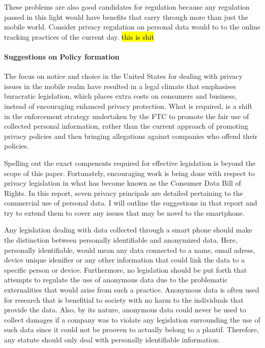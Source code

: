 
These problems are also good candidates for regulation because any regulation passed in this light would have benefits that carry through more than just the mobile world. Consider privacy regulation on personal data would to to the online tracking practices of the current day. \hl{this is shit}

	\paragraph{Suggestions on Policy formation}


The focus on notice and choice in the United States for dealing with privacy issues in the mobile realm have resulted in a legal climate that emphasises buracratic legislation, which places extra costs on consumers and business, instead of encouraging enhanced privacy protection\cite{fair}.
What is required, is a shift in the enforcement strategy undertaken by the FTC to promote the fair use of collected personal information, rather than the current approach of promoting privacy policies and then bringing allegations against companies who offend their policies. 


Spelling out the exact compenents required for effective legislation is beyond the scope of this paper. Fortunately, encouraging work is being done with respect to privacy legislation in what has become known as the Consumer Data Bill of Rights\cite{billofrights}.
In this report, seven privacy principals are detailed pertaining to the commercial use of personal data. 
I will outline the suggestions in that report and try to extend them to cover any issues that may be novel to the smartphone.

Any legislation dealing with data collected through a smart phone should make the distinction between personally identifiable and anonymized data. Here, personally identifiable, would mean any data connected to a name, email adress, device unique idenifier or any other information that could link the data to a specific person or device. Furthermore, no legislation should be put forth that attempts to regulate the use of anonymous data due to the problematic externalities that would arise from such a practice. Anonymous data is often used for research that is benefitial to society with no harm to the individuals that provide the data\cite{unlock}. Also, by its nature, anonymous data could never be used to collect damages if a company was to violate any legislation surrounding the use of such data since it could not be prooven to actually belong to a plantif. Therefore, any statute should only deal with personally identifiable information. 




